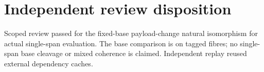\section*{Independent review disposition}
Scoped review passed for the fixed-base payload-change natural isomorphism for actual single-span evaluation. The base comparison is on tagged fibres; no single-span base cleavage or mixed coherence is claimed. Independent replay reused external dependency caches.
